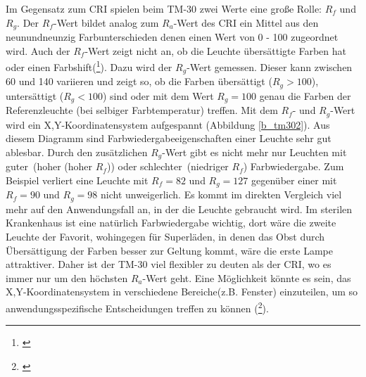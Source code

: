 Im Gegensatz zum CRI spielen beim TM-30 zwei Werte eine große Rolle: $R_{f}$ und $R_{g}$. Der $R_{f}$-Wert bildet analog zum $R_{a}$-Wert des CRI ein Mittel aus den neunundneunzig Farbunterschieden denen einen Wert von 0 - 100 zugeordnet wird. Auch der $R_{f}$-Wert zeigt nicht an, ob die Leuchte übersättigte Farben hat oder einen Farbshift(\footnote{\cite[10]{royerhouser}}). Dazu wird der $R_{g}$-Wert gemessen. Dieser kann zwischen 60 und 140 variieren und zeigt so, ob die Farben übersättigt ($R_{g} > 100$), untersättigt ($R_{g} < 100$) sind oder mit dem Wert $R_{g} = 100$ genau die Farben der Referenzleuchte (bei selbiger Farbtemperatur) treffen. Mit dem $R_{f}$- und $R_{g}$-Wert wird ein X,Y-Koordinatensystem aufgespannt (Abbildung \ref{b_tm302}). Aus diesem Diagramm sind Farbwiedergabeeigenschaften einer Leuchte sehr gut ablesbar. Durch den zusätzlichen $R_{g}$-Wert gibt es nicht mehr nur Leuchten mit \glqq guter\grqq\ (hoher (hoher $R_{f}$)) oder \glqq schlechter\grqq\ (niedriger $R_{f}$) Farbwiedergabe. Zum Beispiel verliert eine Leuchte mit $R_{f}=82$ und $R_{g}=127$ gegenüber einer mit $R_{f}=90$ und $R_{g}=98$ nicht unweigerlich. Es kommt im direkten Vergleich viel mehr auf den Anwendungsfall an, in der die Leuchte gebraucht wird. Im sterilen Krankenhaus ist eine natürlich Farbwiedergabe wichtig, dort wäre die zweite Leuchte der Favorit, wohingegen für Superläden, in denen das Obst durch Übersättigung der Farben besser zur Geltung kommt, wäre die erste Lampe attraktiver. 
Daher ist der TM-30 viel flexibler zu deuten als der CRI, wo es immer nur um den höchsten $R_{a}$-Wert geht. Eine Möglichkeit könnte es sein, das X,Y-Koordinatensystem in verschiedene Bereiche(z.B. Fenster) einzuteilen, um so anwendungsspezifische Entscheidungen treffen zu können (\footnote{\cite[4]{royer}}).  


